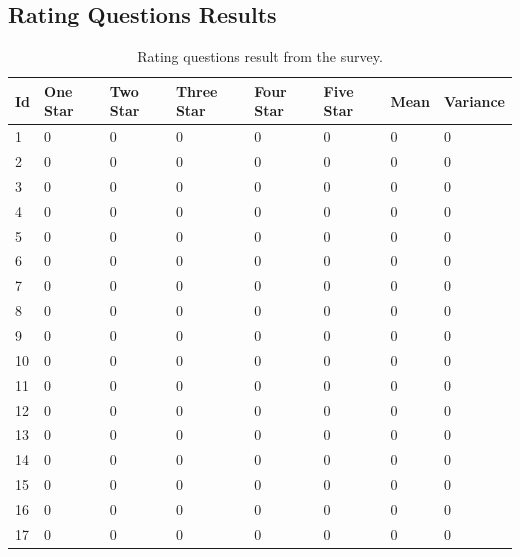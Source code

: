 \documentclass[a4paper,12pt]{article}
\begin{document}
    \subsection{Rating Questions Results}
    \label{subsec:ratingresults}
    \begin{table}[!htbp]
        \begin{center}
            \begin{tabularx}{\textwidth}{llllllll}
                \toprule
                Id & One Star & Two Star & Three Star & Four Star & Five Star & Mean & Variance \\
                \midrule
                1  & 0        & 0        & 0          & 0         & 0         & 0    & 0        \\
                2  & 0        & 0        & 0          & 0         & 0         & 0    & 0        \\
                3  & 0        & 0        & 0          & 0         & 0         & 0    & 0        \\
                4  & 0        & 0        & 0          & 0         & 0         & 0    & 0        \\
                5  & 0        & 0        & 0          & 0         & 0         & 0    & 0        \\
                6  & 0        & 0        & 0          & 0         & 0         & 0    & 0        \\
                7  & 0        & 0        & 0          & 0         & 0         & 0    & 0        \\
                8  & 0        & 0        & 0          & 0         & 0         & 0    & 0        \\
                9  & 0        & 0        & 0          & 0         & 0         & 0    & 0        \\
                10 & 0        & 0        & 0          & 0         & 0         & 0    & 0        \\
                11 & 0        & 0        & 0          & 0         & 0         & 0    & 0        \\
                12 & 0        & 0        & 0          & 0         & 0         & 0    & 0        \\
                13 & 0        & 0        & 0          & 0         & 0         & 0    & 0        \\
                14 & 0        & 0        & 0          & 0         & 0         & 0    & 0        \\
                15 & 0        & 0        & 0          & 0         & 0         & 0    & 0        \\
                16 & 0        & 0        & 0          & 0         & 0         & 0    & 0        \\
                17 & 0        & 0        & 0          & 0         & 0         & 0    & 0        \\
                \bottomrule
            \end{tabularx}
        \end{center}
        \caption{\label{tab:ratingquestionresultstable} Rating questions result from the survey.}
    \end{table}
\end{document}
